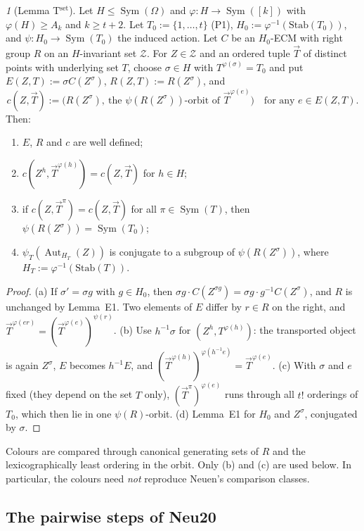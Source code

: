 \documentclass[11pt]{article}
\newenvironment{enumlab}[2][]{\begin{enumerate}\renewcommand{\theenumi}{#1#2{enumi}}%
  \renewcommand{\labelenumi}{(\theenumi)}}{\end{enumerate}}
\theoremstyle{plain}
\theoremstyle{definition}
\theoremstyle{remark}
\theoremstyle{named}
\newtheorem*{named}{}
\theoremstyle{namedrm}
\newcommand{\Sym}{\operatorname{Sym}}
\newcommand{\Aut}{\operatorname{Aut}}
\newcommand{\cZ}{\mathcal{Z}}
\newcommand{\vT}{\vec{T}}
\begin{document}
\begin{named}[Lemma T$^{\text{set}}$]
Let $H\le\Sym(\Omega)$ and $\varphi\colon H\to\Sym([k])$ with $\varphi(H)\ge A_k$ and $k\ge t+2$. Let
$T_0:=\{1,\dots,t\}$ (P1), $H_0:=\varphi^{-1}(\mathrm{Stab}(T_0))$, and $\psi\colon H_0\to\Sym(T_0)$ the induced action.
Let $C$ be an $H_0$-ECM with right group $R$ on an $H$-invariant set $\cZ$. For $Z\in\cZ$ and an ordered tuple
$\vT$ of distinct points with underlying set $T$, choose $\sigma\in H$ with $T^{\varphi(\sigma)}=T_0$ and put
$E(Z,T):=\sigma C(Z^\sigma)$, $R(Z,T):=R(Z^\sigma)$, and
\[ c(Z,\vT):=\big(R(Z^\sigma),\ \text{the }\psi(R(Z^\sigma))\text{-orbit of }\vT^{\varphi(e)}\big)\quad\text{for any }e\in E(Z,T). \]
Then:
\begin{enumlab}{\alph}
\item $E$, $R$ and $c$ are well defined;
\item $c(Z^h,\vT^{\varphi(h)})=c(Z,\vT)$ for $h\in H$;
\item if $c(Z,\vT^\pi)=c(Z,\vT)$ for all $\pi\in\Sym(T)$, then $\psi(R(Z^\sigma))=\Sym(T_0)$;
\item $\psi_T(\Aut_{H_T}(Z))$ is conjugate to a subgroup of $\psi(R(Z^\sigma))$, where $H_T:=\varphi^{-1}(\mathrm{Stab}(T))$.
\end{enumlab}
\end{named}
\begin{proof}
(a) If $\sigma'=\sigma g$ with $g\in H_0$, then $\sigma g\cdot C(Z^{\sigma g})=\sigma g\cdot g^{-1}C(Z^\sigma)$, and $R$ is
unchanged by Lemma~E1. Two elements of $E$ differ by $r\in R$ on the right, and
$\vT^{\varphi(er)}=(\vT^{\varphi(e)})^{\psi(r)}$. (b) Use $h^{-1}\sigma$ for $(Z^h,T^{\varphi(h)})$: the transported object is
again $Z^\sigma$, $E$ becomes $h^{-1}E$, and $(\vT^{\varphi(h)})^{\varphi(h^{-1}e)}=\vT^{\varphi(e)}$. (c) With $\sigma$ and $e$ fixed
(they depend on the set $T$ only), $(\vT^\pi)^{\varphi(e)}$ runs through all $t!$ orderings of $T_0$, which then lie
in one $\psi(R)$-orbit. (d) Lemma~E1 for $H_0$ and $Z^\sigma$, conjugated by $\sigma$.
\end{proof}
Colours are compared through canonical generating sets of $R$ and the lexicographically least ordering in
the orbit. Only (b) and (c) are used below. In particular, the colours need \emph{not} reproduce Neuen's
comparison classes.

\subsection{The pairwise steps of Neu20}
\end{document}
